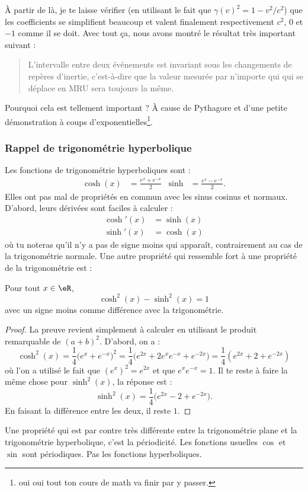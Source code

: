 À partir de là, je te laisse vérifier (en utilisant le fait que \( \gamma(v)^2=1-v^2/c^2\)) que les coefficients se simplifient beaucoup et valent finalement respectivement \( c^2\), \( 0\) et \( -1\) comme il se doit. Avec tout ça, nous avons montré le résultat très important suivant :
\begin{quote}
	L'intervalle entre deux événements est invariant sous les changements de repères d'inertie, c'est-à-dire que la valeur mesurée par n'importe qui qui se déplace en MRU sera toujours la même.
\end{quote}
Pourquoi cela est tellement important ? À cause de Pythagore et d'une petite démonstration à coups d'exponentielles\footnote{oui oui tout ton cours de math va finir par y passer.}.

\subsubsection{Rappel de trigonométrie hyperbolique}
\label{SUBSUBSECooZVHLooYwuhAj}

Les fonctions de trigonométrie hyperboliques sont :
\begin{align}
	\cosh(x) & =\frac{  e^{x}+ e^{-x} }{ 2 } & \sinh & =\frac{  e^{x}- e^{-x} }{ 2 }.
\end{align}
Elles ont pas mal de propriétés en commun avec les sinus cosinus et normaux. D'abord, leurs dérivées sont faciles à calculer :
\[
	\begin{split}
		\cosh'(x)&=\sinh(x)\\
		\sinh'(x)&=\cosh(x)
	\end{split}
\]
où tu noteras qu'il n'y a pas de signe moins qui apparaît, contrairement au cas de la trigonométrie normale. Une autre propriété qui ressemble fort à une propriété de la trigonométrie est :

\begin{proposition}
	Pour tout \( x\in\eR\),
	\begin{equation}
		\cosh^2(x)-\sinh^2(x)=1
	\end{equation}
	avec un signe moins comme différence avec la trigonométrie.
\end{proposition}

\begin{proof}
	La preuve revient simplement à calculer en utilisant le produit remarquable de \( (a+b)^2\). D'abord, on a :
	\[
		\cosh^2(x)=\frac{1}{ 4 }\big(  e^{x}+ e^{-x} \big)^2=\frac{1}{ 4 }\big(  e^{2x}+2 e^{x} e^{-x}+ e^{-2x} \big)=\frac{1}{ 4 }( e^{2x}+2+ e^{-2x})
	\]
	où l'on a utilisé le fait que \( (e^{x})^2= e^{2x}\) et que \(  e^{x} e^{-x}=1\). Il te reste à faire la même chose pour \( \sinh^2(x)\), la réponse est :
	\[
		\sinh^2(x)=\frac{1}{ 4 }\big(  e^{2x}-2+ e^{-2x} \big).
	\]
	En faisant la différence entre les deux, il reste \( 1\).
\end{proof}
Une propriété qui est par contre très différente entre la trigonométrie plane et la trigonométrie hyperbolique, c'est la périodicité. Les fonctions usuelles \( \cos\) et \( \sin\) sont périodiques. Pas les fonctions hyperboliques.

